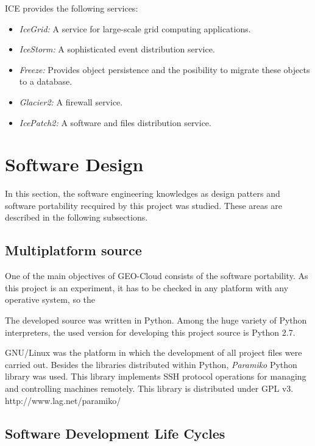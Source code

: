 ICE provides the following services:
\begin{itemize}
\item \emph{IceGrid:} A service for large-scale grid computing applications. 
\item \emph{IceStorm:} A sophisticated event distribution service.
\item \emph{Freeze:} Provides object persistence and the posibility to migrate
  these objects to a database.
\item \emph{Glacier2:} A firewall service.
\item \emph{IcePatch2:} A software and files distribution service.
\end{itemize} 

\section{Software Design}

In this section, the software engineering knowledges as design patters and
software portability recquired by this project was studied. These areas are
described in the following subsections.

\subsection{Multiplatform source}

One of the main objectives of GEO-Cloud consists of the software portability. As
this project is an experiment, it has to be checked in any platform with any
operative system, so the   

The developed source was written in Python. Among the huge variety of Python
interpreters, the used version for developing this project source is Python 2.7.

GNU/Linux was the platform in which the development of all project files were
carried out. Besides the libraries distributed within Python, \emph{Paramiko}
Python library was used. This library implements \ac{SSH} protocol operations
for managing and controlling machines remotely. This library is distributed
under GPL v3.
http://www.lag.net/paramiko/  

\subsection{Software Development Life Cycles}

